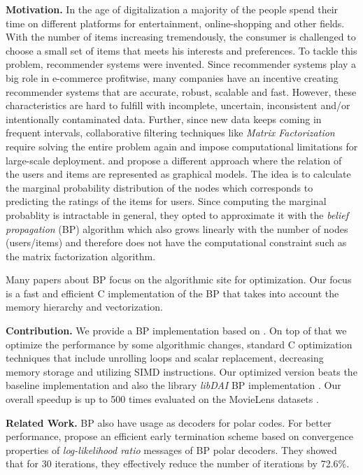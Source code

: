 \documentclass[letterpaper]{article}
\newcommand{\mypar}[1]{{\bf #1.}}
\begin{document}
\mypar{Motivation}
In the age of digitalization a majority of the people spend their time on different platforms for entertainment, online-shopping and other fields. With the number of items increasing tremendously, the consumer is challenged to choose a small set of items that meets his interests and preferences. To tackle this problem, recommender systems were invented. Since recommender systems play a big role in e-commerce profitwise, many companies have an incentive creating recommender systems that are accurate, robust, scalable and fast. However, these characteristics are hard to fulfill with incomplete, uncertain, inconsistent and/or intentionally contaminated data. Further, since new data keeps coming in frequent intervals, collaborative filtering techniques like \emph{Matrix Factorization} require solving the entire problem again and impose computational limitations for large-scale deployment. \citet{BPRS} and \citet{top-n-recommendation} propose a different approach where the relation of the users and items are represented as graphical models. The idea is to calculate the marginal probability distribution of the nodes which corresponds to predicting the ratings of the items for users. Since computing the marginal probablity is intractable in general, they opted to approximate it with the \emph{belief propagation} (BP) algorithm which also grows linearly with the number of nodes (users/items) and therefore does not have the computational constraint such as the matrix factorization algorithm.

Many papers about BP focus on the algorithmic site for optimization. Our focus is a fast and efficient C implementation of the BP that takes into account the memory hierarchy and vectorization.

\mypar{Contribution}
We provide a BP implementation based on \citet{top-n-recommendation}. On top of that we optimize the performance by some algorithmic changes, standard C optimization techniques that include unrolling loops and scalar replacement, decreasing memory storage and utilizing SIMD instructions. Our optimized version beats the baseline implementation and also the library \emph{libDAI} BP implementation \cite{libdai}. Our overall speedup is up to 500 times evaluated on the MovieLens datasets \cite{movieLens}.

\mypar{Related Work}
BP also have usage as decoders for polar codes. For better performance, \citet{related1} propose an efficient early termination scheme based on convergence properties of \emph{log-likelihood ratio} messages of BP polar decoders. They showed that for 30 iterations, they effectively reduce the number of iterations by 72.6\%.
\end{document}
